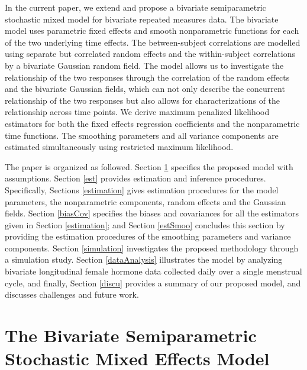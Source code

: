 \documentclass[review]{elsarticle}
\begin{document}
In the current paper, we extend \citet {Zhang:1998} and propose a bivariate semiparametric stochastic mixed model for bivariate repeated measures data.  The bivariate model uses parametric fixed effects and smooth nonparametric functions for each of the two underlying time effects. 
The between-subject correlations are modelled using separate but correlated random effects and the within-subject correlations by a bivariate Gaussian random field. 
The model allows us to investigate the relationship of the two responses through the correlation of the random effects and the bivariate Gaussian fields, which can not only describe the concurrent relationship of the two responses but also allows for characterizations of the relationship across time points.
We derive maximum penalized likelihood estimators for both the fixed effects regression coefficients and the nonparametric time functions. The smoothing parameters and all variance components are estimated simultaneously using restricted maximum likelihood.  


The paper is organized as followed. Section \ref{modelSpe} specifies the proposed model with assumptions. Section \ref{est} provides estimation and inference procedures. Specifically, Sections \ref{estimation} gives estimation procedures for  the model parameters, the nonparametric components, random effects and the Gaussian fields.  
Section \ref{biasCov} specifies the biases and covariances for all the estimators given in Section \ref{estimation}; and Section \ref{estSmoo}  concludes this section by providing the estimation procedures of the smoothing parameters and variance components. 
Section \ref{simulation} investigates the proposed methodology through a simulation study.  
Section \ref{dataAnalysis}  illustrates the model by analyzing bivariate longitudinal female hormone data collected daily over a single menstrual cycle, and finally, Section \ref{discu} provides a summary of our proposed model, and discusses challenges and future work. 

%
%
%
\section{The Bivariate Semiparametric Stochastic Mixed Effects Model} \label{modelSpe}


\end{document}
